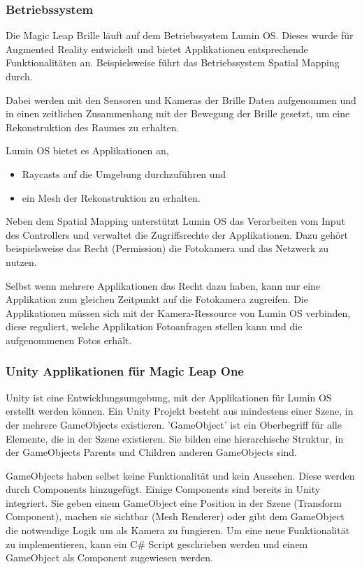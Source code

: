 \subsubsection{Betriebssystem}
Die Magic Leap Brille läuft auf dem Betriebssystem Lumin OS. Dieses wurde für Augmented Reality entwickelt und bietet Applikationen entsprechende Funktionalitäten an. Beispielsweise führt das Betriebssystem Spatial Mapping durch.\citep{mlluminOS,mlluminfeatures}

Dabei werden mit den Sensoren und Kameras der Brille Daten aufgenommen und in einen zeitlichen Zusammenhang mit der Bewegung der Brille gesetzt, um eine Rekonstruktion des Raumes zu erhalten.\citep{mlluminOS,mlluminfeatures,mlluminworldreconstruktion,mlmeshingunity}

Lumin OS bietet es Applikationen an,
\begin{itemize}
	\item Raycasts auf die Umgebung durchzuführen und
	\item ein Mesh der Rekonstruktion zu erhalten.
\end{itemize}
Neben dem Spatial Mapping unterstützt Lumin OS das Verarbeiten vom Input des Controllers und verwaltet die Zugriffsrechte der Applikationen. Dazu gehört beispielsweise das Recht (Permission) die Fotokamera und das Netzwerk zu nutzen.\citep{mlluminfeatures,mlappsecurity}

Selbst wenn mehrere Applikationen das Recht dazu haben, kann nur eine Applikation zum gleichen Zeitpunkt auf die Fotokamera zugreifen. Die Applikationen müssen sich mit der Kamera-Ressource von Lumin OS verbinden, diese reguliert, welche Applikation Fotoanfragen stellen kann und die aufgenommenen Fotos erhält. 


\subsubsection{Unity Applikationen für Magic Leap One}

Unity ist eine Entwicklungsumgebung, mit der Applikationen für Lumin OS erstellt werden können. Ein Unity Projekt besteht aus mindestens einer Szene, in der mehrere GameObjects existieren. 'GameObject' ist ein Oberbegriff für alle Elemente, die in der Szene existieren. Sie bilden eine hierarchische Struktur, in der GameObjects Parents und Children anderen GameObjects sind.\citep{unitygameobject}

GameObjects haben selbst keine Funktionalität und kein Aussehen. Diese werden durch Components hinzugefügt. Einige Components sind bereits in Unity integriert. Sie geben einem GameObject eine Position in der Szene (Transform Component), machen sie sichtbar (Mesh Renderer) oder gibt dem GameObject die notwendige Logik um als Kamera zu fungieren. Um eine neue Funktionalität zu implementieren, kann ein C\# Script geschrieben werden und einem GameObject als Component zugewiesen werden.

